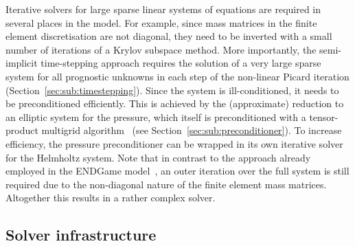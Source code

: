 \documentclass[review,times]{elsarticle}
\begin{document}
Iterative solvers for large sparse linear systems of equations are
required in several places in the model. For example, since mass
matrices in the finite element discretisation are not diagonal, they
need to be inverted with a small number of iterations of a Krylov
subspace method. More importantly, the semi-implicit time-stepping
approach requires the solution of a very large sparse system for all
prognostic unknowns in each step of the non-linear Picard
iteration (Section~\ref{sec:sub:timestepping}). 
Since the system is ill-conditioned, it needs to be
preconditioned efficiently. This is achieved by the (approximate)
reduction to an elliptic system for the pressure, which itself is
preconditioned with a tensor-product multigrid algorithm~\cite{Borm2001} 
(see Section~\ref{sec:sub:preconditioner}). To increase
efficiency, the pressure preconditioner can be wrapped in its own
iterative solver for the Helmholtz system. Note that in contrast to
the approach already employed in the ENDGame model~\cite{QJ:QJ2235},
an outer iteration over the full system is still required due to the
non-diagonal nature of the finite element mass matrices. Altogether
this results in a rather complex solver.

\subsection{\label{sec:sub:solvinf}Solver infrastructure}
\end{document}
